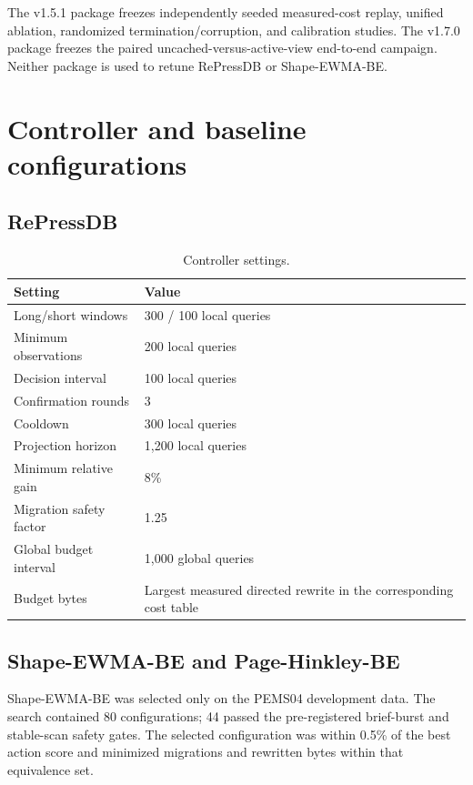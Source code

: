 \documentclass[preprint,12pt,authoryear]{elsarticle}
\begin{document}
The v1.5.1 package freezes independently seeded measured-cost replay, unified ablation, randomized termination/corruption, and calibration studies. The v1.7.0 package freezes the paired uncached-versus-active-view end-to-end campaign. Neither package is used to retune RePressDB or Shape-EWMA-BE.

\section{Controller and baseline configurations}

\subsection{RePressDB}

\begin{table}[H]
\centering
\caption{Controller settings.}
\begin{tabularx}{\textwidth}{@{}p{}X@{}}
\toprule
Setting & Value \\
\midrule
Long/short windows & 300 / 100 local queries \\
Minimum observations & 200 local queries \\
Decision interval & 100 local queries \\
Confirmation rounds & 3 \\
Cooldown & 300 local queries \\
Projection horizon & 1,200 local queries \\
Minimum relative gain & 8\% \\
Migration safety factor & 1.25 \\
Global budget interval & 1,000 global queries \\
Budget bytes & Largest measured directed rewrite in the corresponding cost table \\
\bottomrule
\end{tabularx}
\end{table}

\subsection{Shape-EWMA-BE and Page-Hinkley-BE}

Shape-EWMA-BE was selected only on the PEMS04 development data. The search contained 80 configurations; 44 passed the pre-registered brief-burst and stable-scan safety gates. The selected configuration was within 0.5\% of the best action score and minimized migrations and rewritten bytes within that equivalence set.
\end{document}
